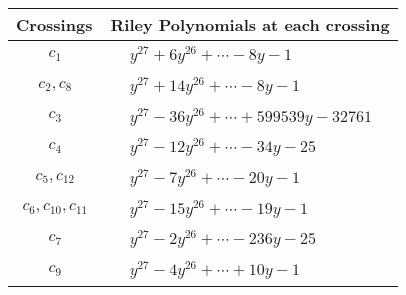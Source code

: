 \documentclass[1p]{elsarticle_modified}
\theoremstyle{definition}
\begin{document}
\begin{tabular}{m{50pt}|m{274pt}}
Crossings & \hspace{64pt}Riley Polynomials at each crossing \\
\hline $$\begin{aligned}c_{1}\end{aligned}$$&$\begin{aligned}
&y^{27}+6 y^{26}+\cdots-8 y-1
\end{aligned}$\\
\hline $$\begin{aligned}c_{2},c_{8}\end{aligned}$$&$\begin{aligned}
&y^{27}+14 y^{26}+\cdots-8 y-1
\end{aligned}$\\
\hline $$\begin{aligned}c_{3}\end{aligned}$$&$\begin{aligned}
&y^{27}-36 y^{26}+\cdots+599539 y-32761
\end{aligned}$\\
\hline $$\begin{aligned}c_{4}\end{aligned}$$&$\begin{aligned}
&y^{27}-12 y^{26}+\cdots-34 y-25
\end{aligned}$\\
\hline $$\begin{aligned}c_{5},c_{12}\end{aligned}$$&$\begin{aligned}
&y^{27}-7 y^{26}+\cdots-20 y-1
\end{aligned}$\\
\hline $$\begin{aligned}c_{6},c_{10},c_{11}\end{aligned}$$&$\begin{aligned}
&y^{27}-15 y^{26}+\cdots-19 y-1
\end{aligned}$\\
\hline $$\begin{aligned}c_{7}\end{aligned}$$&$\begin{aligned}
&y^{27}-2 y^{26}+\cdots-236 y-25
\end{aligned}$\\
\hline $$\begin{aligned}c_{9}\end{aligned}$$&$\begin{aligned}
&y^{27}-4 y^{26}+\cdots+10 y-1
\end{aligned}$\\
\hline
\end{tabular}\\~\\
\end{document}
